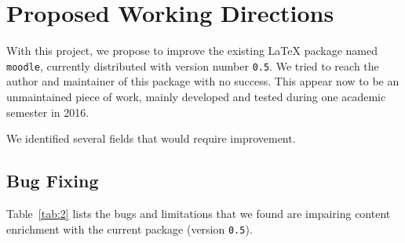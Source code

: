\documentclass[twocolumn,a4paper,9pt]{article}
\begin{document}
\section{Proposed Working Directions}

With this project, we propose to improve the existing \LaTeX{} package named 
\texttt{moodle}, currently distributed with version number \texttt{0.5}.
We tried to reach the author and maintainer of this package with no success. 
This appear now to be an unmaintained piece of work, mainly developed and 
tested during one academic semester in 2016.

We identified several fields that would require improvement.

\subsection{Bug Fixing}

Table~\ref{tab:2} lists the bugs and limitations that we found are impairing 
content enrichment with the current package (version \texttt{0.5}).
\end{document}
